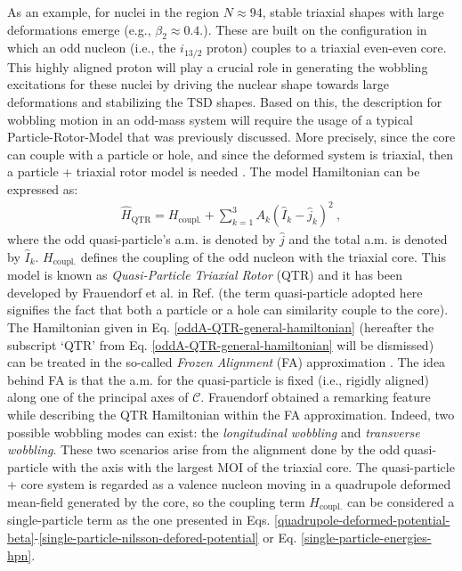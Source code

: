 As an example, for nuclei in the region $N\approx 94$, stable triaxial shapes with large deformations emerge (e.g., $\beta_2\approx0.4$.). These are built on the configuration in which an odd nucleon (i.e., the $i_{13/2}$ proton) couples to a triaxial even-even core. This highly aligned proton will play a crucial role in generating the wobbling excitations for these nuclei by driving the nuclear shape towards large deformations and stabilizing the TSD shapes. Based on this, the description for wobbling motion in an odd-mass system will require the usage of a typical Particle-Rotor-Model that was previously discussed. More precisely, since the core can couple with a particle or hole, and since the deformed system is triaxial, then a particle + triaxial rotor model is needed \cite{frauendorf2014transverse}. The model Hamiltonian can be expressed as:
\begin{align}
    \hat{H}_\text{QTR}=H_\text{coupl.}+\sum_{k=1}^{3}A_k(\hat{I}_k-\hat{j}_k)^2\ ,
    \label{oddA-QTR-general-hamiltonian}
\end{align}
where the odd quasi-particle's a.m. is denoted by $\hat{j}$ and the total a.m. is denoted by $\hat{I}_k$. $H_\text{coupl.}$ defines the coupling of the odd nucleon with the triaxial core. This model is known as \emph{Quasi-Particle Triaxial Rotor} (QTR) and it has been developed by Frauendorf et al. in Ref. \cite{frauendorf2014transverse} (the term quasi-particle adopted here signifies the fact that both a particle or a hole can similarity couple to the core). The Hamiltonian given in Eq. \ref{oddA-QTR-general-hamiltonian} (hereafter the subscript `QTR' from Eq. \ref{oddA-QTR-general-hamiltonian} will be dismissed) can be treated in the so-called \emph{Frozen Alignment} (FA) approximation \cite{frauendorf2014transverse}. The idea behind FA is that the a.m. for the quasi-particle is fixed (i.e., rigidly aligned) along one of the principal axes of $\mathscr{C}$. Frauendorf obtained a remarking feature while describing the QTR Hamiltonian within the FA approximation. Indeed, two possible wobbling modes can exist: the \emph{longitudinal wobbling} and \emph{transverse wobbling}. These two scenarios arise from the alignment done by the odd quasi-particle with the axis with the largest MOI of the triaxial core. The  quasi-particle + core system is regarded as a valence nucleon moving in a quadrupole deformed mean-field generated by the core, so the coupling term $H_\text{coupl.}$ can be considered a single-particle term as the one presented in Eqs. \ref{quadrupole-deformed-potential-beta}-\ref{single-particle-nilsson-defored-potential} or Eq. \ref{single-particle-energies-hpn}.

